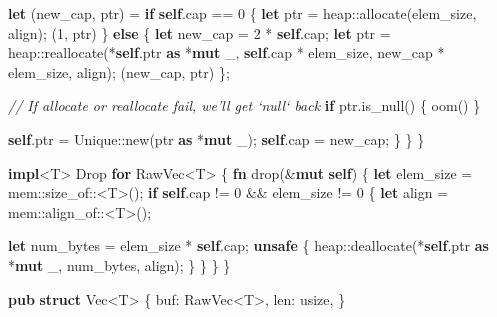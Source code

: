 \documentclass[a4paper,]{book}
\newenvironment{Shaded}{\begin{snugshade}}{\end{snugshade}}
\newcommand{\KeywordTok}[1]{\textcolor[rgb]{0.13,0.29,0.53}{\textbf{{#1}}}}
\newcommand{\DataTypeTok}[1]{\textcolor[rgb]{0.13,0.29,0.53}{{#1}}}
\newcommand{\DecValTok}[1]{\textcolor[rgb]{0.00,0.00,0.81}{{#1}}}
\newcommand{\CommentTok}[1]{\textcolor[rgb]{0.56,0.35,0.01}{\textit{{#1}}}}
\newcommand{\BuiltInTok}[1]{{#1}}
\newcommand{\NormalTok}[1]{{#1}}
\begin{document}
\begin{Shaded}
\begin{Highlighting}[]
            \KeywordTok{let} \NormalTok{(new_cap, ptr) = }\KeywordTok{if} \KeywordTok{self}\NormalTok{.cap == }\DecValTok{0} \NormalTok{\{}
                \KeywordTok{let} \NormalTok{ptr = heap::allocate(elem_size, align);}
                \NormalTok{(}\DecValTok{1}\NormalTok{, ptr)}
            \NormalTok{\} }\KeywordTok{else} \NormalTok{\{}
                \KeywordTok{let} \NormalTok{new_cap = }\DecValTok{2} \NormalTok{* }\KeywordTok{self}\NormalTok{.cap;}
                \KeywordTok{let} \NormalTok{ptr = heap::reallocate(*}\KeywordTok{self}\NormalTok{.ptr }\KeywordTok{as} \NormalTok{*}\KeywordTok{mut} \NormalTok{_,}
                                            \KeywordTok{self}\NormalTok{.cap * elem_size,}
                                            \NormalTok{new_cap * elem_size,}
                                            \NormalTok{align);}
                \NormalTok{(new_cap, ptr)}
            \NormalTok{\};}

            \CommentTok{// If allocate or reallocate fail, we'll get `null` back}
            \KeywordTok{if} \NormalTok{ptr.is_null() \{ oom() \}}

            \KeywordTok{self}\NormalTok{.ptr = Unique::new(ptr }\KeywordTok{as} \NormalTok{*}\KeywordTok{mut} \NormalTok{_);}
            \KeywordTok{self}\NormalTok{.cap = new_cap;}
        \NormalTok{\}}
    \NormalTok{\}}
\NormalTok{\}}

\KeywordTok{impl}\NormalTok{<T> }\BuiltInTok{Drop} \KeywordTok{for} \NormalTok{RawVec<T> \{}
    \KeywordTok{fn} \NormalTok{drop(&}\KeywordTok{mut} \KeywordTok{self}\NormalTok{) \{}
        \KeywordTok{let} \NormalTok{elem_size = mem::size_of::<T>();}
        \KeywordTok{if} \KeywordTok{self}\NormalTok{.cap != }\DecValTok{0} \NormalTok{&& elem_size != }\DecValTok{0} \NormalTok{\{}
            \KeywordTok{let} \NormalTok{align = mem::align_of::<T>();}

            \KeywordTok{let} \NormalTok{num_bytes = elem_size * }\KeywordTok{self}\NormalTok{.cap;}
            \KeywordTok{unsafe} \NormalTok{\{}
                \NormalTok{heap::deallocate(*}\KeywordTok{self}\NormalTok{.ptr }\KeywordTok{as} \NormalTok{*}\KeywordTok{mut} \NormalTok{_, num_bytes, align);}
            \NormalTok{\}}
        \NormalTok{\}}
    \NormalTok{\}}
\NormalTok{\}}





\KeywordTok{pub} \KeywordTok{struct} \DataTypeTok{Vec}\NormalTok{<T> \{}
    \NormalTok{buf: RawVec<T>,}
    \NormalTok{len: }\DataTypeTok{usize}\NormalTok{,}
\NormalTok{\}}


\end{Highlighting}
\end{Shaded}
\end{document}
